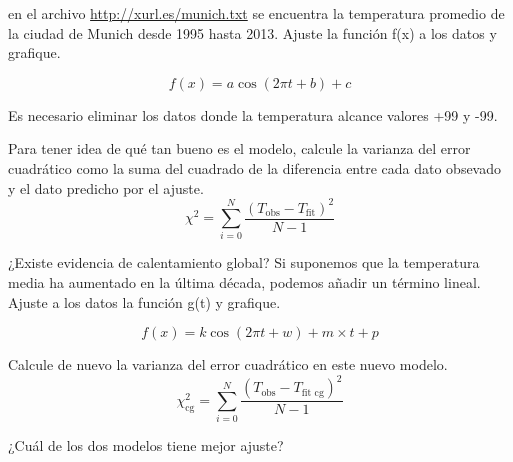\documentclass[11pt,letterpaper]{exam}
\begin{document}
\begin{questions}

 en el archivo 
\url{http://xurl.es/munich.txt} se encuentra la temperatura promedio de 
la ciudad de Munich desde 1995 hasta 2013. 
Ajuste la función f(x) a los datos y grafique.

$$f(x) = a \cos \left( 2\pi t + b \right) + c $$

Es necesario eliminar los datos donde la temperatura alcance valores
+99 y -99.

 Para tener idea de qué tan bueno es el modelo, calcule la varianza del error cuadrático como la suma del cuadrado de la diferencia entre cada dato obsevado y el dato predicho por el ajuste.
$$ \chi^2 = \sum_{i=0}^{N} \frac{ \left(T_{\textrm{obs}} - T_\textrm{fit}
\right)^2}{N-1} $$

 ¿Existe evidencia de calentamiento global? Si suponemos que la temperatura media ha aumentado en la última década, podemos añadir un término lineal.
Ajuste a los datos la función g(t) y grafique.

$$f(x) = k \cos \left( 2\pi t + w \right) + m\times t + p$$


Calcule de nuevo la varianza del error cuadrático en este nuevo modelo.
$$ \chi_\textrm{cg}^2 = \sum_{i=0}^{N} \frac{ \left(T_{\textrm{obs}} - T_\textrm{fit cg}\right)^2}{N-1} $$

 ¿Cuál de los dos modelos tiene mejor ajuste?
\end{questions}
\end{document}
